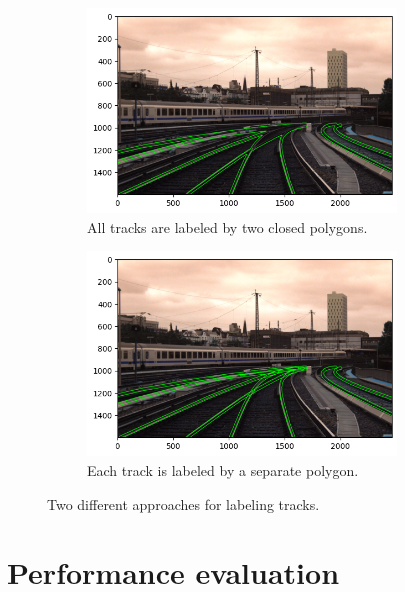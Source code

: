 \documentclass[Master,MDS,english]{BASE/twbook} %
\begin{document}
\begin{figure}
\centering
\begin{subfigure}[t]{.5\textwidth}
  \centering
  \includegraphics[width=0.9\textwidth]{images/labeling/label_union}
  \caption{All tracks are labeled by two closed polygons.}
\end{subfigure}%
\begin{subfigure}[t]{.5\textwidth}
  \centering
  \includegraphics[width=0.9\textwidth]{images/labeling/label_single}
  \caption{Each track is labeled by a separate polygon.}
\end{subfigure}
\caption{Two different approaches for labeling tracks.}
\label{fig:labeling2}
\end{figure}



\section{Performance evaluation}
\end{document}
